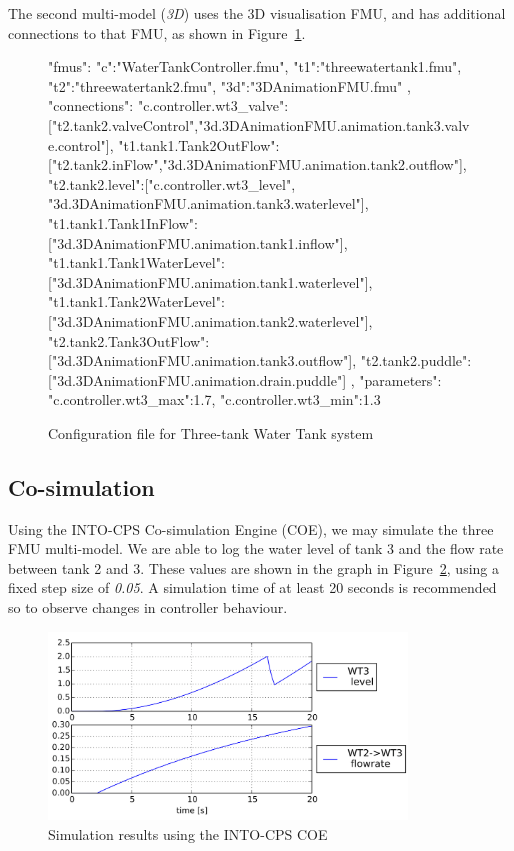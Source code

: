 The second multi-model (\emph{3D}) uses the 3D visualisation FMU, and has additional connections to that FMU, as shown in Figure~\ref{fig:threetankconfig2}.

\begin{figure}[htbp]
\begin{center}
\begin{config}
{
	"fmus":{
		"{c}":"WaterTankController.fmu",
		"{t1}":"threewatertank1.fmu",
		"{t2}":"threewatertank2.fmu",
		"{3d}":"3DAnimationFMU.fmu"
	},
	"connections":{
		"{c}.controller.wt3_valve":["{t2}.tank2.valveControl","{3d}.3DAnimationFMU.animation.tank3.valve.control"],
		"{t1}.tank1.Tank2OutFlow":["{t2}.tank2.inFlow","{3d}.3DAnimationFMU.animation.tank2.outflow"],
		"{t2}.tank2.level":["{c}.controller.wt3_level", "{3d}.3DAnimationFMU.animation.tank3.waterlevel"],
		"{t1}.tank1.Tank1InFlow":["{3d}.3DAnimationFMU.animation.tank1.inflow"],
		"{t1}.tank1.Tank1WaterLevel":["{3d}.3DAnimationFMU.animation.tank1.waterlevel"],
		"{t1}.tank1.Tank2WaterLevel":["{3d}.3DAnimationFMU.animation.tank2.waterlevel"],
		"{t2}.tank2.Tank3OutFlow":["{3d}.3DAnimationFMU.animation.tank3.outflow"],
		"{t2}.tank2.puddle":["{3d}.3DAnimationFMU.animation.drain.puddle"]
	},
	"parameters":{
		"{c}.controller.wt3_max":1.7,
		"{c}.controller.wt3_min":1.3
	}
}
\end{config}
\caption{Configuration file for Three-tank Water Tank system}
\label{fig:threetankconfig2}
\end{center}
\end{figure}

\subsection{Co-simulation}
\label{sec:threetank_into_co}

Using the INTO-CPS Co-simulation Engine (COE), we may simulate the three FMU multi-model. We are able to log the water level of tank 3 and the flow rate between tank 2 and 3. These values are shown in the graph in Figure~\ref{fig:threetankcoeres}, using a fixed step size of \emph{0.05}. A simulation time of at least 20 seconds is recommended so to observe changes in controller behaviour.

\begin{figure}[htbp]
\begin{center}
\includegraphics[width=0.85\textwidth]{threetank/ttwt_coe_res.png}
\caption{Simulation results using the INTO-CPS COE}
\label{fig:threetankcoeres}
\end{center}
\end{figure}

